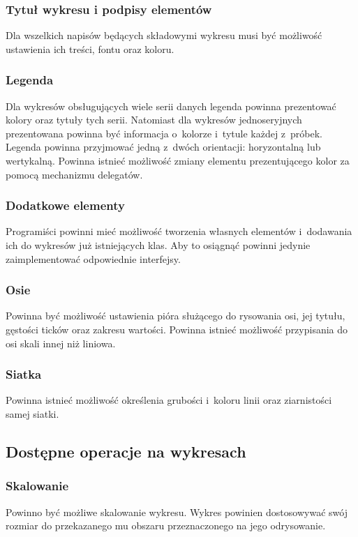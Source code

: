 \subsubsection{Tytuł wykresu i podpisy elementów}
Dla wszelkich napisów będących składowymi wykresu musi być możliwość ustawienia ich treści, fontu oraz koloru.

\subsubsection{Legenda}
Dla wykresów obsługujących wiele serii danych legenda powinna prezentować kolory oraz tytuły tych serii. Natomiast dla wykresów jednoseryjnych prezentowana powinna być informacja o~kolorze i~tytule każdej z~próbek. Legenda powinna przyjmować jedną z~dwóch orientacji: horyzontalną lub wertykalną. Powinna istnieć możliwość zmiany elementu prezentującego kolor za pomocą mechanizmu delegatów.

\subsubsection{Dodatkowe elementy}
Programiści powinni mieć możliwość tworzenia własnych elementów i~dodawania ich do wykresów już istniejących klas. Aby to osiągnąć powinni jedynie zaimplementować odpowiednie interfejsy.

\subsubsection{Osie}
Powinna być możliwość ustawienia pióra służącego do rysowania osi, jej tytułu, gęstości ticków oraz zakresu wartości. Powinna istnieć możliwość przypisania do osi skali innej niż liniowa.

\subsubsection{Siatka}
Powinna istnieć możliwość określenia grubości i~koloru linii oraz ziarnistości samej siatki.

\subsection{Dostępne operacje na wykresach}
\subsubsection{Skalowanie}
Powinno być możliwe skalowanie wykresu. Wykres powinien dostosowywać swój rozmiar do przekazanego mu obszaru przeznaczonego na jego odrysowanie.

